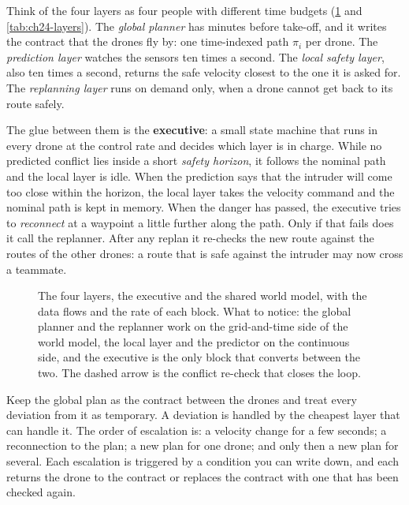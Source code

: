 Think of the four layers as four people with different time budgets
(\cref{fig:ch24-architecture} and \cref{tab:ch24-layers}). The \emph{global
planner} has minutes before take-off, and it writes the contract that the
drones fly by: one time-indexed path $\pi_i$ per drone. The \emph{prediction
layer} watches the sensors ten times a second. The \emph{local safety
layer}, also ten times a second, returns the safe velocity closest to the
one it is asked for. The \emph{replanning layer} runs on demand only, when a
drone cannot get back to its route safely.

The glue between them is the \textbf{executive}: a small
state machine that runs in every drone at the control rate and decides which
layer is in charge. While no predicted conflict lies inside a short
\emph{safety horizon}, it follows the nominal path and the local layer is
idle. When the prediction says that the intruder will come too close within
the horizon, the local layer takes the velocity command and the nominal path
is kept in memory. When the danger has passed, the executive tries to
\emph{reconnect} at a waypoint a little further along the path. Only if that
fails does it call the replanner. After any replan it re-checks the new
route against the routes of the other drones: a route that is safe against
the intruder may now cross a teammate.

\begin{figure}[tb]
  \centering
  \caption{The four layers, the executive and the shared world model, with
  the data flows and the rate of each block. What to notice: the global
  planner and the replanner work on the grid-and-time side of the world
  model, the local layer and the predictor on the continuous side, and the
  executive is the only block that converts between the two. The dashed
  arrow is the conflict re-check that closes the loop.}
  \label{fig:ch24-architecture}
\end{figure}

\begin{keyidea}
Keep the global plan as the contract between the drones and treat every
deviation from it as temporary. A deviation is handled by the cheapest layer
that can handle it. The order of escalation is: a velocity change for a few
seconds; a reconnection to the plan; a new plan for one drone; and only then
a new plan for several. Each escalation is triggered by a condition you can write
down, and each returns the drone to the contract or replaces the contract
with one that has been checked again.
\end{keyidea}

